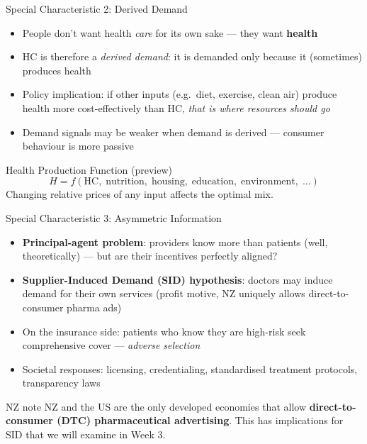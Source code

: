 \documentclass[aspectratio=169, 12pt]{beamer}
\begin{document}
\begin{frame}{Special Characteristic 2: Derived Demand}
  \begin{itemize}
    \item People don't want health \emph{care} for its own sake --- they want \textbf{health}
    \item HC is therefore a \textit{derived demand}: it is demanded only because it (sometimes)
          produces health
    \item Policy implication: if other inputs (e.g.\ diet, exercise, clean air) produce health
          more cost-effectively than HC, \emph{that is where resources should go}
    \item Demand signals may be weaker when demand is derived --- consumer behaviour is more
          passive
  \end{itemize}
  \vspace{0.3em}
  \begin{block}{Health Production Function (preview)}
    $$H = f(\text{HC},\; \text{nutrition},\; \text{housing},\; \text{education},\; \text{environment},\; \ldots)$$
    Changing relative prices of any input affects the optimal mix.
  \end{block}
\end{frame}

\begin{frame}{Special Characteristic 3: Asymmetric Information}
  \begin{itemize}
    \item \textbf{Principal-agent problem}: providers know more than patients (well, theoretically) --- but are
          their incentives perfectly aligned?
    \item \textbf{Supplier-Induced Demand (SID) hypothesis}: doctors may induce demand for
          their own services (profit motive, NZ uniquely allows direct-to-consumer pharma ads)
    \item On the insurance side: patients who know they are high-risk seek comprehensive cover
          --- \textit{adverse selection}
    \item Societal responses: licensing, credentialing, standardised treatment protocols,
          transparency laws
  \end{itemize}
  \begin{exampleblock}{NZ note}
    NZ and the US are the only developed economies that allow \textbf{direct-to-consumer (DTC)
    pharmaceutical advertising}. This has implications for SID that we will examine in Week 3.
  \end{exampleblock}
\end{frame}
\end{document}
